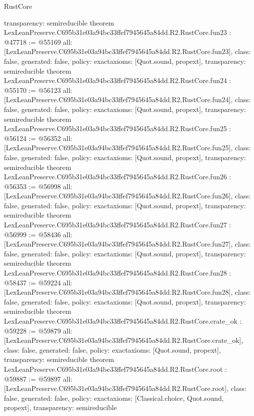 \begin{lexlean}{RustCore}
\begin{coremodule}
{  transparency: semireducible
}
theorem LexLeanPreserve.C695b31e03a94bc33ffef7945645a84dd.R2.RustCore.fun23 : @47718 := @55169 {
  all: [LexLeanPreserve.C695b31e03a94bc33ffef7945645a84dd.R2.RustCore.fun23],
  class: false,
  generated: false,
  policy: exact{axioms: [Quot.sound, propext]},
  transparency: semireducible
}
theorem LexLeanPreserve.C695b31e03a94bc33ffef7945645a84dd.R2.RustCore.fun24 : @55170 := @56123 {
  all: [LexLeanPreserve.C695b31e03a94bc33ffef7945645a84dd.R2.RustCore.fun24],
  class: false,
  generated: false,
  policy: exact{axioms: [Quot.sound, propext]},
  transparency: semireducible
}
theorem LexLeanPreserve.C695b31e03a94bc33ffef7945645a84dd.R2.RustCore.fun25 : @56124 := @56352 {
  all: [LexLeanPreserve.C695b31e03a94bc33ffef7945645a84dd.R2.RustCore.fun25],
  class: false,
  generated: false,
  policy: exact{axioms: [Quot.sound, propext]},
  transparency: semireducible
}
theorem LexLeanPreserve.C695b31e03a94bc33ffef7945645a84dd.R2.RustCore.fun26 : @56353 := @56998 {
  all: [LexLeanPreserve.C695b31e03a94bc33ffef7945645a84dd.R2.RustCore.fun26],
  class: false,
  generated: false,
  policy: exact{axioms: [Quot.sound, propext]},
  transparency: semireducible
}
theorem LexLeanPreserve.C695b31e03a94bc33ffef7945645a84dd.R2.RustCore.fun27 : @56999 := @58436 {
  all: [LexLeanPreserve.C695b31e03a94bc33ffef7945645a84dd.R2.RustCore.fun27],
  class: false,
  generated: false,
  policy: exact{axioms: [Quot.sound, propext]},
  transparency: semireducible
}
theorem LexLeanPreserve.C695b31e03a94bc33ffef7945645a84dd.R2.RustCore.fun28 : @58437 := @59224 {
  all: [LexLeanPreserve.C695b31e03a94bc33ffef7945645a84dd.R2.RustCore.fun28],
  class: false,
  generated: false,
  policy: exact{axioms: [Quot.sound, propext]},
  transparency: semireducible
}
theorem LexLeanPreserve.C695b31e03a94bc33ffef7945645a84dd.R2.RustCore.crate_ok : @59228 := @59879 {
  all: [LexLeanPreserve.C695b31e03a94bc33ffef7945645a84dd.R2.RustCore.crate_ok],
  class: false,
  generated: false,
  policy: exact{axioms: [Quot.sound, propext]},
  transparency: semireducible
}
theorem LexLeanPreserve.C695b31e03a94bc33ffef7945645a84dd.R2.RustCore.root : @59887 := @59897 {
  all: [LexLeanPreserve.C695b31e03a94bc33ffef7945645a84dd.R2.RustCore.root],
  class: false,
  generated: false,
  policy: exact{axioms: [Classical.choice, Quot.sound, propext]},
  transparency: semireducible
}


\end{coremodule}
\end{lexlean}
